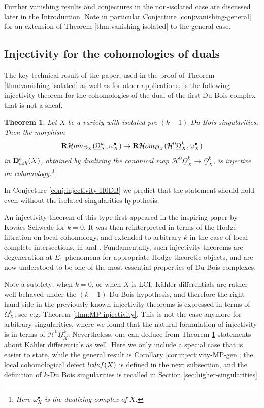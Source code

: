 \documentclass[11pt]{amsart}
\theoremstyle{definition}
\theoremstyle{plain}
\renewcommand{\H}{\mathcal H}
\renewcommand{\O}{\mathcal O}
\newcommand{\DD}{\mathbf D}
\newcommand{\RHom}{{\bf R} \H om}
\newcommand{\DB}{\underline{\Omega}} %
\newcounter{intro}
\newtheorem{intro-theorem}[intro]{Theorem}
\begin{document}
Further vanishing results and conjectures in the non-isolated case are discussed later in the Introduction. Note in particular Conjecture \ref{conj:vanishing-general} for an extension of Theorem \ref{thm:vanishing-isolated} to the general case.


\subsection*{Injectivity for the cohomologies of duals}
The key technical result of the paper,  used in the proof of Theorem \ref{thm:vanishing-isolated} as well as for other applications, is the following injectivity theorem for the cohomologies of the dual of the first Du Bois complex that is not a sheaf.

\begin{intro-theorem}\label{thm:injectivity-H0DB}
    Let $X$ be a variety with isolated pre-$(k-1)$-Du Bois singularities. Then the morphism
    \[\RHom_{\O_X}(\DB_X^k,\omega_X^{\bullet})\to \RHom_{\O_X}(\H^0\DB_X^k,\omega_X^{\bullet})\]
    in $\DD^b_{\rm coh} (X)$, obtained by dualizing the canonical map $\H^0\DB_X^k \to \DB_X^k$,
    is injective on cohomology.\footnote{Here $\omega_X^{\bullet}$ is the dualizing complex of $X$.}
\end{intro-theorem}

In Conjecture \ref{conj:injectivity-H0DB} we predict that the statement should hold even without the isolated singularities hypothesis.

An injectivity theorem of this type first appeared in the inspiring paper \cite{KS-injectivity} by Kov\'acs-Schwede for $k=0$.  It was then reinterpreted in terms of the Hodge filtration on local cohomology, and extended to arbitrary $k$ in the case of local complete intersections, 
in \cite{MP-LC} and \cite{MP-lci}. Fundamentally, such injectivity theorems are degeneration at $E_1$ phenomena for appropriate Hodge-theoretic objects, and are now understood to be one of the most essential properties of Du Bois complexes.

Note a subtlety: when $k = 0$, or when $X$ is LCI, K\"ahler differentials are rather well behaved under the $(k-1)$-Du Bois hypothesis, and therefore the right hand side in the previously known injectivity theorems is expressed in terms of $\Omega_X^k$; see e.g. Theorem \ref{thm:MP-injectivity}. This is not the case anymore for arbitrary singularities, where we found that the natural formulation of injectivity is in terms of $\H^0 \DB_X^k$.
Nevertheless, one can deduce from Theorem \ref{thm:injectivity-H0DB} statements about K\"ahler differentials as well. Here we only include 
a special case that is easier to state, while the general result is Corollary \ref{cor:injectivity-MP-gen}; the local cohomological defect ${\rm lcdef}(X)$ is defined in the next subsection, and the definition of $k$-Du Bois singularities is recalled in Section \ref{sec:higher-singularities}.
\end{document}
